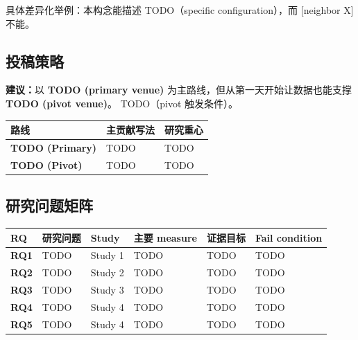 具体差异化举例：本构念能描述 TODO（specific configuration），而 [neighbor X] 不能。


\subsection{投稿策略}

\begin{bluebox}
\textbf{建议：}以 \textbf{TODO (primary venue)} 为主路线，但从第一天开始让数据也能支撑 \textbf{TODO (pivot venue)}。
TODO（pivot 触发条件）。
\end{bluebox}

\begin{center}
\small
\begin{tabularx}{\textwidth}{>{\bfseries}p{}X X}
\toprule
路线 & 主贡献写法 & 研究重心 \\
\midrule
TODO (Primary) & TODO & TODO \\
TODO (Pivot) & TODO & TODO \\
\bottomrule
\end{tabularx}
\end{center}


\subsection{研究问题矩阵}

\begin{center}
\small
\begin{tabularx}{\textwidth}{>{\bfseries}p{}X p{} p{} p{} p{}}
\toprule
RQ & 研究问题 & Study & 主要 measure & 证据目标 & Fail condition \\
\midrule
RQ1 & TODO & Study 1 & TODO & TODO & TODO \\
RQ2 & TODO & Study 2 & TODO & TODO & TODO \\
RQ3 & TODO & Study 3 & TODO & TODO & TODO \\
RQ4 & TODO & Study 4 & TODO & TODO & TODO \\
RQ5 & TODO & Study 4 & TODO & TODO & TODO \\
\bottomrule
\end{tabularx}
\end{center}

